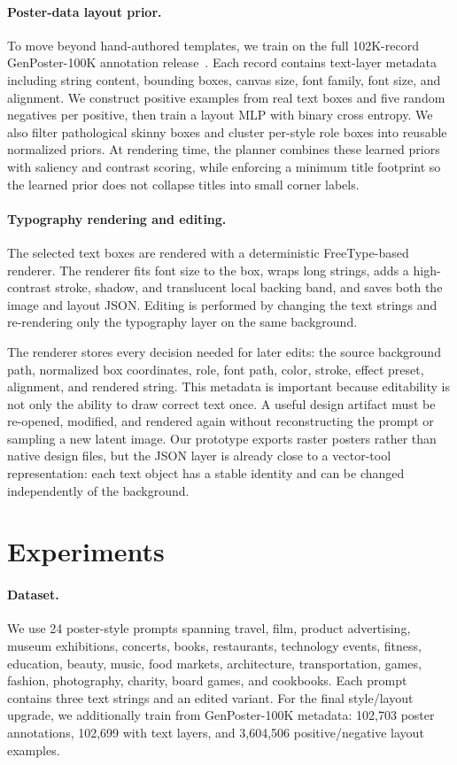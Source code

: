 \documentclass[10pt,twocolumn,letterpaper]{article}
\begin{document}
\paragraph{Poster-data layout prior.}
To move beyond hand-authored templates, we train on the full 102K-record GenPoster-100K annotation release~\cite{genposter100k}. Each record contains text-layer metadata including string content, bounding boxes, canvas size, font family, font size, and alignment. We construct positive examples from real text boxes and five random negatives per positive, then train a layout MLP with binary cross entropy. We also filter pathological skinny boxes and cluster per-style role boxes into reusable normalized priors. At rendering time, the planner combines these learned priors with saliency and contrast scoring, while enforcing a minimum title footprint so the learned prior does not collapse titles into small corner labels.

\paragraph{Typography rendering and editing.}
The selected text boxes are rendered with a deterministic FreeType-based renderer. The renderer fits font size to the box, wraps long strings, adds a high-contrast stroke, shadow, and translucent local backing band, and saves both the image and layout JSON. Editing is performed by changing the text strings and re-rendering only the typography layer on the same background.

The renderer stores every decision needed for later edits: the source background path, normalized box coordinates, role, font path, color, stroke, effect preset, alignment, and rendered string. This metadata is important because editability is not only the ability to draw correct text once. A useful design artifact must be re-opened, modified, and rendered again without reconstructing the prompt or sampling a new latent image. Our prototype exports raster posters rather than native design files, but the JSON layer is already close to a vector-tool representation: each text object has a stable identity and can be changed independently of the background.

\section{Experiments}

\paragraph{Dataset.}
We use 24 poster-style prompts spanning travel, film, product advertising, museum exhibitions, concerts, books, restaurants, technology events, fitness, education, beauty, music, food markets, architecture, transportation, games, fashion, photography, charity, board games, and cookbooks. Each prompt contains three text strings and an edited variant. For the final style/layout upgrade, we additionally train from GenPoster-100K metadata: 102,703 poster annotations, 102,699 with text layers, and 3,604,506 positive/negative layout examples.
\end{document}
